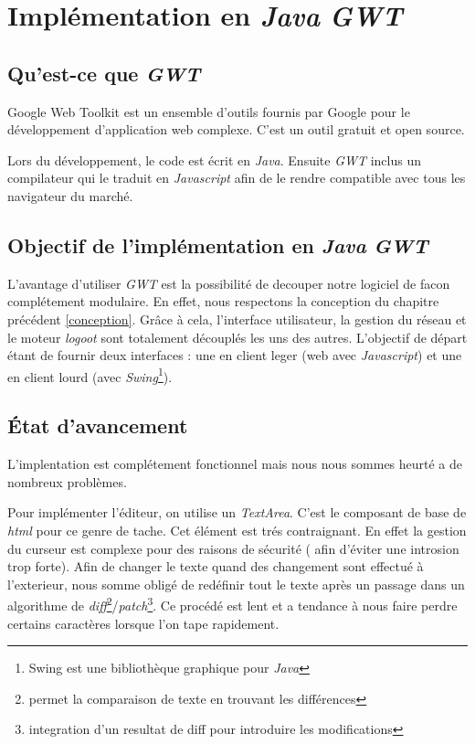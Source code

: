 \section{Implémentation en \emph{Java} \emph{GWT}}
  \subsection{Qu'est-ce que \emph{GWT}}
  Google Web Toolkit est un ensemble d'outils fournis par Google pour le
   développement d'application web complexe. C'est un outil gratuit et 
   open source.
   
   Lors du développement, le code est écrit en  \emph{Java}. Ensuite \emph{GWT} 
   inclus un compilateur qui le traduit en \emph{Javascript} afin de le rendre 
   compatible avec tous les navigateur du marché.
   
  \subsection{Objectif de l'implémentation en \emph{Java} \emph{GWT}}
  L'avantage d'utiliser \emph{GWT} est la possibilité de decouper notre 
  logiciel de facon complétement modulaire. En effet, nous respectons la
  conception du chapitre précédent \ref{conception}. Grâce à cela, 
  l'interface utilisateur, la gestion du réseau et le moteur \emph{logoot}
  sont totalement découplés les uns des autres. L'objectif de départ étant
  de fournir deux interfaces : une en client leger (web avec \emph{Javascript})
  et une en client lourd (avec \emph{Swing}\footnote{Swing est une bibliothèque
  graphique pour \emph{Java}}). 
  
  \subsection{État d'avancement}
	L'implentation est complétement fonctionnel mais nous nous sommes heurté
	a de nombreux problèmes.
	
	\label{sec:textarea}
	Pour implémenter l'éditeur, on utilise un \emph{TextArea}. C'est le 
	composant de base de \emph{html} pour ce genre de tache. Cet élément 
	est trés contraignant. En effet la gestion du curseur est complexe
	pour des raisons de sécurité ( afin d'éviter une introsion trop forte).
	Afin de changer le texte quand des changement sont effectué à 
	l'exterieur, nous somme obligé de redéfinir tout le texte après un 
	passage dans un algorithme de \emph{diff}\footnote{permet la comparaison 
	de texte en trouvant les différences}/\emph{patch}\footnote{integration
	d'un resultat de diff pour introduire les modifications}. Ce procédé
	est lent et a tendance à nous faire perdre certains caractères lorsque
	l'on tape rapidement.
	
